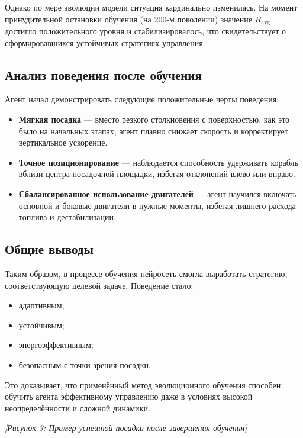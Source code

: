 \documentclass[a4paper,12pt]{article}
\begin{document}
Однако по мере эволюции модели ситуация кардинально изменилась. На момент принудительной остановки обучения (на 200-м поколении) значение $R_{\text{avg}}$ достигло положительного уровня и стабилизировалось, что свидетельствует о сформировавшихся устойчивых стратегиях управления.

\subsection{Анализ поведения после обучения}

Агент начал демонстрировать следующие положительные черты поведения:
\begin{itemize}
    \item \textbf{Мягкая посадка} — вместо резкого столкновения с поверхностью, как это было на начальных этапах, агент плавно снижает скорость и корректирует вертикальное ускорение.
    
    \item \textbf{Точное позиционирование} — наблюдается способность удерживать корабль вблизи центра посадочной площадки, избегая отклонений влево или вправо.
    
    \item \textbf{Сбалансированное использование двигателей} — агент научился включать основной и боковые двигатели в нужные моменты, избегая лишнего расхода топлива и дестабилизации.
\end{itemize}

\subsection{Общие выводы}

Таким образом, в процессе обучения нейросеть смогла выработать стратегию, соответствующую целевой задаче. Поведение стало:
\begin{itemize}
    \item адаптивным;
    \item устойчивым;
    \item энергоэффективным;
    \item безопасным с точки зрения посадки.
\end{itemize}

Это доказывает, что применённый метод эволюционного обучения способен обучить агента эффективному управлению даже в условиях высокой неопределённости и сложной динамики.

\begin{center}
    \textit{[Рисунок 3: Пример успешной посадки после завершения обучения]}
\end{center}
\end{document}
